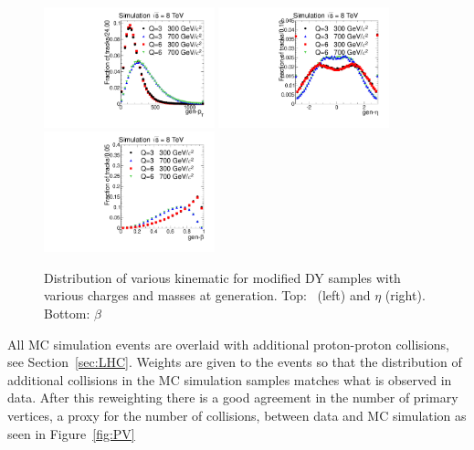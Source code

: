 \begin{figure}
 \begin{center}
  \includegraphics[clip=false, trim=0.0cm 0cm 1.4cm 0cm, width=0.44\textwidth]{figures/muonly/Selection_Comp_DY_genpT}
  \includegraphics[clip=false, trim=0.0cm 0cm 1.4cm 0cm, width=0.44\textwidth]{figures/muonly/Selection_Comp_DY_geneta}
  \includegraphics[clip=false, trim=0.0cm 0cm 1.4cm 0cm, width=0.44\textwidth]{figures/muonly/Selection_Comp_DY_genbeta}
 \end{center}
 \caption[Distribution of \pt, $\eta$, and $\beta$ for modified DY samples with various charges and masses at generation]
{Distribution of various kinematic for modified DY samples with various charges and masses at generation.
Top: \pt\ (left) and $\eta$ (right).
Bottom: $\beta$}
   \label{fig:GenDY}
\end{figure}

All MC simulation events are overlaid with additional proton-proton collisions, see Section~\ref{sec:LHC}.
Weights are given to the events so that the distribution of additional collisions in the MC simulation samples matches what is observed in data.
After this reweighting there is a good agreement in the number of primary vertices, a proxy for the number of collisions, between data and MC simulation as seen in Figure~\ref{fig:PV}

